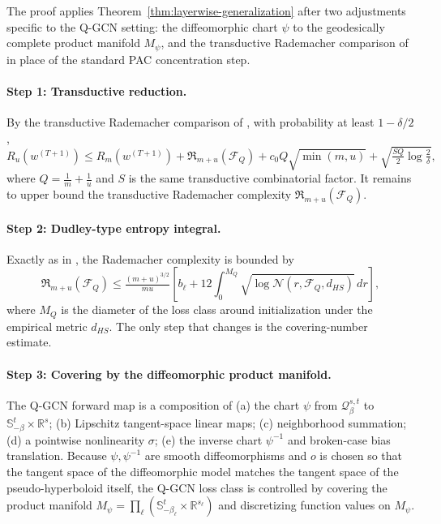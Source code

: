 \documentclass[letterpaper]{article}
\newcommand{\R}{\mathbb{R}}
\begin{document}
The proof applies Theorem~\ref{thm:layerwise-generalization} after two
adjustments specific to the Q-GCN setting: the diffeomorphic chart
$\psi$ to the geodesically complete product manifold $M_\psi$, and the
transductive Rademacher comparison of \cite{tang2023towards} in place of
the standard PAC concentration step.

\paragraph{Step 1: Transductive reduction.}
By the transductive Rademacher comparison of
\cite[Theorem~4.3]{tang2023towards}, with probability at least
$1 - \delta/2$,
\begin{equation}
\label{eq:pr_step1}
R_u(w^{(T+1)}) \leq R_m(w^{(T+1)}) + \mathfrak R_{m+u}(\mathcal F_Q)
+ c_0 Q \sqrt{\min(m, u)} + \sqrt{\tfrac{SQ}{2} \log\tfrac{2}{\delta}},
\end{equation}
where $Q = \tfrac1m + \tfrac1u$ and $S$ is the same transductive
combinatorial factor. It remains to upper bound the transductive
Rademacher complexity $\mathfrak R_{m+u}(\mathcal F_Q)$.

\paragraph{Step 2: Dudley-type entropy integral.}
Exactly as in \cite{tang2023towards}, the Rademacher complexity is bounded
by
\begin{equation}
\label{eq:pr_step2}
\mathfrak R_{m+u}(\mathcal F_Q) \leq \tfrac{(m+u)^{3/2}}{mu}
\left[ b_\ell + 12 \int_0^{M_Q}
\sqrt{\log \mathcal N(r, \mathcal F_Q, d_{HS})}\, dr \right],
\end{equation}
where $M_Q$ is the diameter of the loss class around initialization under
the empirical metric $d_{HS}$. The only step that changes is the
covering-number estimate.

\paragraph{Step 3: Covering by the diffeomorphic product manifold.}
The Q-GCN forward map is a composition of (a) the chart $\psi$ from
$\mathcal Q_\beta^{s,t}$ to $\mathbb S^t_{-\beta} \times \R^s$;
(b) Lipschitz tangent-space linear maps;
(c) neighborhood summation;
(d) a pointwise nonlinearity $\sigma$;
(e) the inverse chart $\psi^{-1}$ and broken-case bias translation.
Because $\psi, \psi^{-1}$ are smooth diffeomorphisms and $o$ is chosen so
that the tangent space of the diffeomorphic model matches the tangent
space of the pseudo-hyperboloid itself, the Q-GCN loss class is controlled
by covering the product manifold $M_\psi = \prod_\ell (\mathbb
S^t_{-\beta_\ell} \times \R^{s_\ell})$ and discretizing function values on
$M_\psi$.
\end{document}
